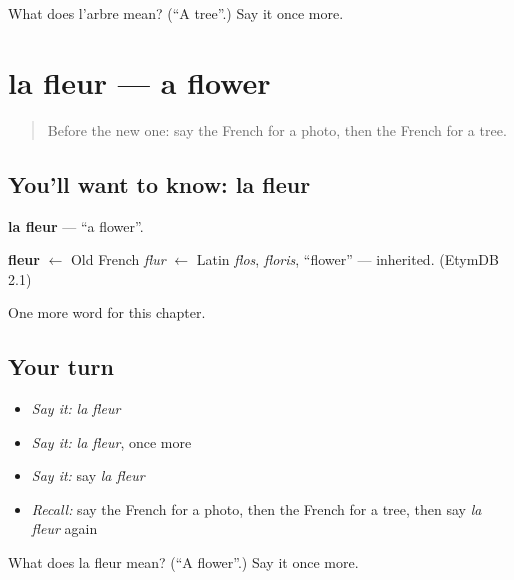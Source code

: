 \begin{tcolorbox}[breakable,colback=teal!4,colframe=teal!35!black,title={Before you move on}]
What does l'arbre mean? (\textquotedblleft{}A tree\textquotedblright{}.) Say it once more.
\end{tcolorbox}
\section[la fleur]{la fleur — a flower}

\label{lesson:FR-C81-fleur}



\begin{quote}
Before the new one: say the French for a photo, then the French for a tree.
\end{quote}

\subsection*{You'll want to know: la fleur}
\textbf{la fleur} — \textquotedblleft{}a flower\textquotedblright{}.

\begin{cousinweb}
\textbf{fleur} $\leftarrow$ Old French \emph{flur} $\leftarrow$ Latin \emph{flos}, \emph{floris}, \textquotedblleft{}flower\textquotedblright{} — inherited. (EtymDB 2.1)
\end{cousinweb}

\begin{grammarlens}[title={What you've built}]
One more word for this chapter.
\end{grammarlens}

\subsection*{Your turn}
\begin{itemize}
\raggedright
  \item \emph{Say it:} \emph{la fleur}
  \item \emph{Say it:} \emph{la fleur}, once more
  \item \emph{Say it:} say \emph{la fleur}
  \item \emph{Recall:} say the French for a photo, then the French for a tree, then say \emph{la fleur} again
\end{itemize}

\begin{tcolorbox}[breakable,colback=teal!4,colframe=teal!35!black,title={Before you move on}]
What does la fleur mean? (\textquotedblleft{}A flower\textquotedblright{}.) Say it once more.
\end{tcolorbox}
